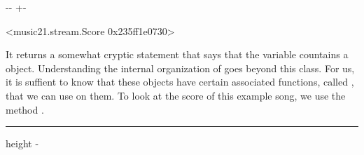 \documentclass[letterpaper,10pt,english]{sphinxmanual}
\newlength\nbsphinxcodecellspacing
\begin{document}
{
\begin{sphinxVerbatim}[commandchars=\\\{\}]
\llap{\color{nbsphinxin}[8]:\,\hspace{\fboxrule}\hspace{\fboxsep}}
\end{sphinxVerbatim}
}

{

\kern-\sphinxverbatimsmallskipamount\kern-\baselineskip
\kern+\FrameHeightAdjust\kern-\fboxrule
\vspace{\nbsphinxcodecellspacing}

\begin{sphinxVerbatim}[commandchars=\\\{\}]
\llap{\color{nbsphinxout}[8]:\,\hspace{\fboxrule}\hspace{\fboxsep}}<music21.stream.Score 0x235ff1e0730>
\end{sphinxVerbatim}
}

It returns a somewhat cryptic statement that says that the variable countains a  object. Understanding the internal organization of  goes beyond this class. For us, it is suffient to know that these objects have certain associated functions, called , that we can use on them. To look at the score of this example song, we use the method .

{
\begin{sphinxVerbatim}[commandchars=\\\{\}]
\llap{\color{nbsphinxin}[9]:\,\hspace{\fboxrule}\hspace{\fboxsep}}
\end{sphinxVerbatim}
}

\hrule height -\fboxrule\relax
\vspace{\nbsphinxcodecellspacing}

\makeatletter\setbox\nbsphinxpromptbox\box\voidb@x\makeatother
\end{document}

